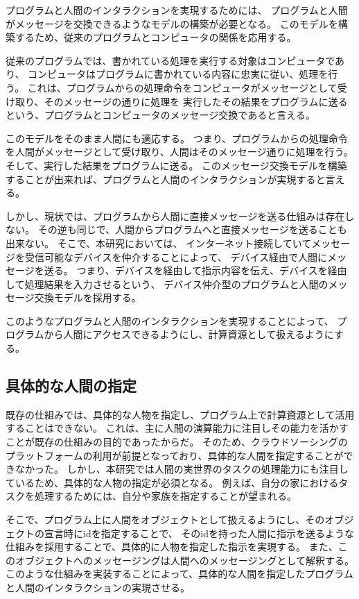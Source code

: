 プログラムと人間のインタラクションを実現するためには、
プログラムと人間がメッセージを交換できるようなモデルの構築が必要となる。
このモデルを構築するため、従来のプログラムとコンピュータの関係を応用する。

従来のプログラムでは、書かれている処理を実行する対象はコンピュータであり、
コンピュータはプログラムに書かれている内容に忠実に従い、処理を行う。
これは、プログラムからの処理命令をコンピュータがメッセージとして受け取り、そのメッセージの通りに処理を
実行したその結果をプログラムに送るという、プログラムとコンピュータのメッセージ交換であると言える。

このモデルをそのまま人間にも適応する。
つまり、プログラムからの処理命令を人間がメッセージとして受け取り、人間はそのメッセージ通りに処理を行う。
そして、実行した結果をプログラムに送る。
このメッセージ交換モデルを構築することが出来れば、プログラムと人間のインタラクションが実現すると言える。

しかし、現状では、プログラムから人間に直接メッセージを送る仕組みは存在しない。
その逆も同じで、人間からプログラムへと直接メッセージを送ることも出来ない。
そこで、本研究においては、
インターネット接続していてメッセージを受信可能なデバイスを仲介することによって、
デバイス経由で人間にメッセージを送る。
つまり、デバイスを経由して指示内容を伝え、デバイスを経由して処理結果を入力させるという、
デバイス仲介型のプログラムと人間のメッセージ交換モデルを採用する。

このようなプログラムと人間のインタラクションを実現することによって、
プログラムから人間にアクセスできるようにし、計算資源として扱えるようにする。

\subsection{具体的な人間の指定}\label{ux5177ux4f53ux7684ux306aux4ebaux9593ux306eux6307ux5b9a}

既存の仕組みでは、具体的な人物を指定し、プログラム上で計算資源として活用することはできない。
これは、主に人間の演算能力に注目しその能力を活かすことが既存の仕組みの目的であったからだ。
そのため、クラウドソーシングのプラットフォームの利用が前提となっており、具体的な人間を指定することができなかった。
しかし、本研究では人間の実世界のタスクの処理能力にも注目しているため、具体的な人物の指定が必須となる。
例えば、自分の家におけるタスクを処理するためには、自分や家族を指定することが望まれる。

そこで、プログラム上に人間をオブジェクトとして扱えるようにし、そのオブジェクトの宣言時にidを指定することで、
そのidを持った人間に指示を送るような仕組みを採用することで、具体的に人物を指定した指示を実現する。
また、このオブジェクトへのメッセージングは人間へのメッセージングとして解釈する。
このような仕組みを実装することによって、具体的な人間を指定したプログラムと人間のインタラクションの実現させる。

